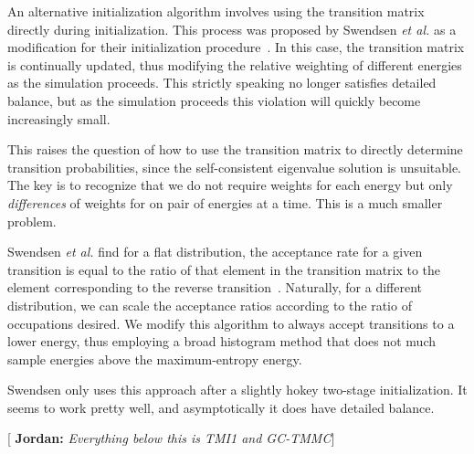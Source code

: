 \documentclass[letterpaper,twocolumn,amsmath,amssymb,pre,aps,10pt]{revtex4-1}
\newcommand{\blue}[1]{{\bf \color{blue} #1}}
\newcommand{\jpsays}[1]{{\color{red} [\blue{Jordan:} \emph{#1}]}}
\begin{document}
An alternative initialization algorithm involves using the transition
matrix directly during initialization.  This process was proposed by
Swendsen \emph{et al.} as a modification for their initialization
procedure~\cite{swendsen1999transition}.  In this case, the transition
matrix is continually updated, thus modifying the relative weighting
of different energies as the simulation proceeds.  This strictly
speaking no longer satisfies detailed balance, but as the simulation
proceeds this violation will quickly become increasingly small.

This raises the question of how to use the transition matrix to
directly determine transition probabilities, since the self-consistent
eigenvalue solution is unsuitable.  The key is to recognize that we do
not require weights for each energy but only \emph{differences} of
weights for on pair of energies at a time.  This is a much smaller
problem.

Swendsen \emph{et al.} find for a flat distribution, the acceptance
rate for a given transition is equal to the ratio of that element in
the transition matrix to the element corresponding to the reverse
transition~\cite{swendsen1999transition}.  Naturally, for a different
distribution, we can scale the acceptance ratios according to the
ratio of occupations desired.  We modify this algorithm to always
accept transitions to a lower energy, thus employing a broad histogram
method that does not much sample energies above the maximum-entropy
energy.

Swendsen only uses this approach after a slightly hokey two-stage
initialization.  It seems to work pretty well, and asymptotically it
does have detailed balance.

\newpage
\jpsays{Everything below this is TMI1 and GC-TMMC}
\subsection{}
\end{document}
